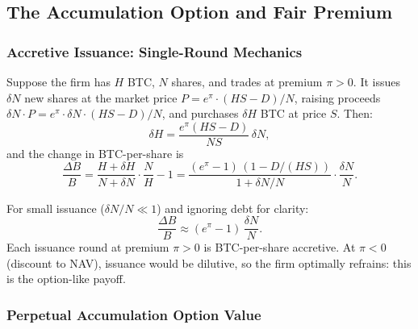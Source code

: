 \subsection{The Accumulation Option and Fair Premium}
\label{sec:fair_premium}

\subsubsection{Accretive Issuance: Single-Round Mechanics}
\label{sec:single_round}

\begin{definition}
  \label{def:single_accretion}
  Suppose the firm has $H$ BTC, $N$ shares, and trades at premium $\pi > 0$.
  It issues $\delta N$ new shares at the market price
  $P = e^\pi \cdot (HS - D)/N$, raising proceeds
  $\delta N \cdot P = e^\pi \cdot \delta N \cdot (HS - D)/N$, and purchases
  $\delta H$ BTC at price $S$.  Then:
  \begin{equation}
    \label{eq:delta_H}
    \delta H = \frac{e^\pi (HS - D)}{NS}\,\delta N,
  \end{equation}
  and the change in BTC-per-share is
  \begin{equation}
    \label{eq:accretion_single}
    \frac{\Delta B}{B}
    = \frac{H + \delta H}{N + \delta N}\cdot\frac{N}{H} - 1
    = \frac{(e^\pi - 1)\,(1 - D/(HS))}{1 + \delta N / N}\cdot
      \frac{\delta N}{N}.
  \end{equation}
\end{definition}

For small issuance ($\delta N / N \ll 1$) and ignoring debt for clarity:
\begin{equation}
  \label{eq:accretion_approx}
  \frac{\Delta B}{B} \approx (e^\pi - 1)\,\frac{\delta N}{N}.
\end{equation}
Each issuance round at premium $\pi > 0$ is BTC-per-share accretive.  At
$\pi < 0$ (discount to NAV), issuance would be dilutive, so the firm
optimally refrains: this is the option-like payoff.

\subsubsection{Perpetual Accumulation Option Value}
\label{sec:vacc}

